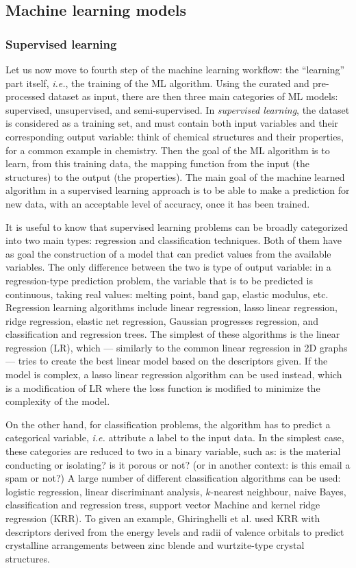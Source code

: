 \documentclass[aip,apm,amsmath,amssymb,reprint]{revtex4-2}
\begin{document}
\subsection{Machine learning models}

\subsubsection{Supervised learning}

Let us now move to fourth step of the machine learning workflow: the ``learning'' part itself, \emph{i.e.}, the training of the ML algorithm. Using the curated and pre-processed dataset as input, there are then three main categories of ML models: supervised, unsupervised, and semi-supervised. In \emph{supervised learning}, the dataset is considered as a training set, and must contain both input variables and their corresponding output variable: think of chemical structures and their properties, for a common example in chemistry. Then the goal of the ML algorithm is to learn, from this training data, the mapping function from the input (the structures) to the output (the properties). The main goal of the machine learned algorithm in a supervised learning approach is to be able to make a prediction for new data, with an acceptable level of accuracy, once it has been trained.

It is useful to know that supervised learning problems can be broadly categorized into two main types: regression and classification techniques. Both of them have as goal the construction of a model that can predict values from the available variables. The only difference between the two is type of output variable: in a regression-type prediction problem, the variable that is to be predicted is continuous, taking real values: melting point, band gap, elastic modulus, etc. Regression learning algorithms include linear regression, lasso linear regression, ridge regression, elastic net regression, Gaussian progresses regression, and classification and regression trees. The simplest of these algorithms is the linear regression (LR), which --- similarly to the common linear regression in 2D graphs --- tries to create the best linear model based on the descriptors given. If the model is complex, a lasso linear regression algorithm can be used instead, which is a modification of LR where the loss function is modified to minimize the complexity of the model.

On the other hand, for classification problems, the algorithm has to predict a categorical variable, \emph{i.e.} attribute a label to the input data. In the simplest case, these categories are reduced to two in a binary variable, such as: is the material conducting or isolating? is it porous or not? (or in another context: is this email a spam or not?) A large number of different classification algorithms can be used: logistic regression, linear discriminant analysis, $k$-nearest neighbour, naive Bayes, classification and regression tress, support vector Machine and kernel ridge regression (KRR). To given an example, Ghiringhelli et al. used KRR with descriptors derived from the energy levels and radii of valence orbitals to predict crystalline arrangements between zinc blende and wurtzite-type crystal structures.\cite{Ghiringhelli2015}
\end{document}
